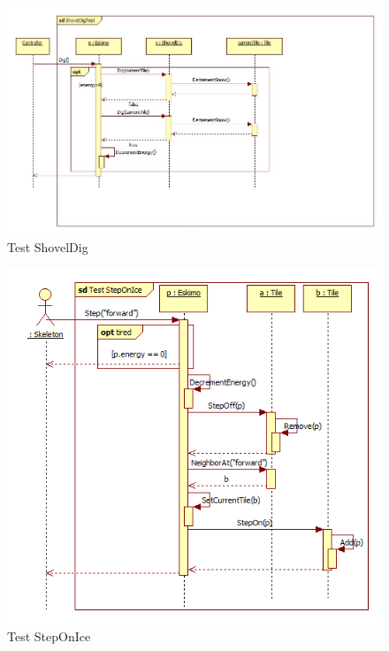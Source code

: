 \begin{figure}[H]
	\begin{center}
		\includegraphics[width=17cm]{chapters/chapter05/diagrams/TestShovelDig.jpg}
		\caption{Test ShovelDig}
		\label{fig:Test ShovelDig}
	\end{center}
\end{figure}

\begin{figure}[H]
	\begin{center}
		\includegraphics[width=13cm]{chapters/chapter05/diagrams/Test_StepOnIce.png}
		\caption{Test StepOnIce}
		\label{fig:Test StepOnIce}
	\end{center}
\end{figure}

